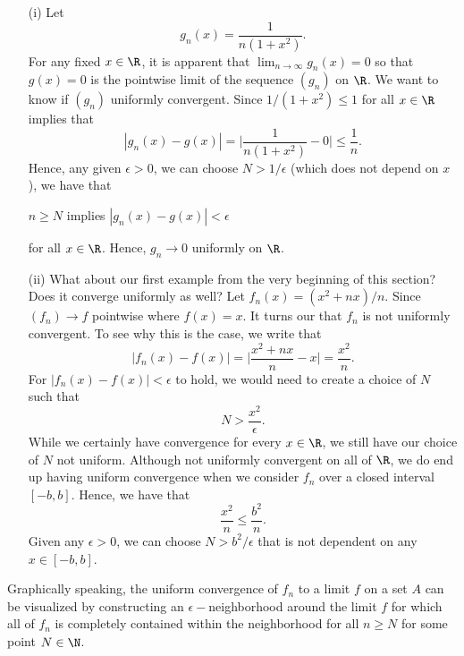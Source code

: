 \begin{ex}
\begin{enumerate}
    \item[(i)] Let 
        \[  g_n(x) = \frac{ 1 }{ n(1 + x^2 ) }.  \]
        For any fixed \( x \in \R  \), it is apparent that \( \lim_{ n \to \infty  } g_n(x) = 0  \) so that \( g(x) = 0   \) is the pointwise limit of the sequence \( (g_n)  \) on \( \R  \). We want to know if \( (g_n)  \) uniformly convergent. Since \( 1 / (1 + x^2 )  \leq 1  \) for all \( x \in \R  \) implies that 
        \[  | g_n(x) - g(x)  | = \Big| \frac{ 1 }{ n(1+x^2 )  } - 0  \Big| \leq \frac{ 1 }{ n }.  \]
Hence, any given \( \epsilon > 0  \), we can choose \( N > 1 / \epsilon  \) (which does not depend on \( x  \)), we have that
\begin{center}
    \( n \geq N  \) implies \( | g_n(x) - g(x)  | < \epsilon  \)
\end{center}
for all \( x \in \R  \). Hence, \( g_n \to 0 \) uniformly on \( \R  \).
\item[(ii)] What about our first example from the very beginning of this section? Does it converge uniformly as well?  Let \( f_n(x) = (x^2 + n x ) / n  \). Since \( (f_n) \to f  \) pointwise where \( f(x) =x  \). It turns our that \( f_n  \) is not uniformly convergent. To see why this is the case, we write that
    \[  | f_n(x) - f(x)  | = \Big| \frac{ x^2 + nx  }{ n  } - x  \Big| = \frac{ x^2  }{ n }. \]
    For \( | f_n(x) - f(x)  | < \epsilon  \) to hold, we would need to create a choice of \( N  \) such that 
    \[  N  > \frac{ x^2  }{ \epsilon  }. \]
    While we certainly have convergence for every \( x \in \R  \), we still have our choice of \( N  \) not uniform. Although not uniformly convergent on all of \( \R  \), we do end up having uniform convergence when we consider \( f_n  \) over a closed interval \( [-b,b] \). Hence, we have that 
    \[  \frac{ x^2  }{ n }  \leq \frac{ b^2  }{ n  }. \]
    Given any \( \epsilon > 0  \), we can choose \( N > b^2 / \epsilon  \) that is not dependent on any \( x \in [-b,b]  \).
\end{enumerate}
\end{ex}

Graphically speaking, the uniform convergence of \( f_n  \) to a limit \( f  \) on a set \( A  \) can be visualized by constructing an \( \epsilon -  \)neighborhood around the limit \( f  \) for which all of \( f_n  \) is completely contained within the neighborhood for all \(  n \geq N  \) for some point \( N \in \N  \).

